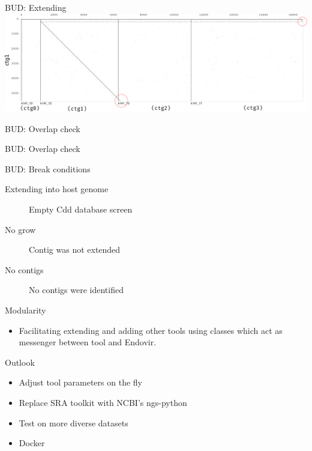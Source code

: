 \documentclass{beamer}
\begin{document}
  \begin{frame}{BUD: Extending}
    \includegraphics[width=\linewidth]{figs/ebovexample/flanks/flankgrow.pdf}
  \end{frame}


  \begin{frame}{BUD: Overlap check}
    
  \end{frame}

  \begin{frame}{BUD: Overlap check}
    
  \end{frame}

  \begin{frame}{BUD: Break conditions}
    \begin{description}
      \item[Extending into host genome]  Empty Cdd database screen
      \item[No grow] Contig was not extended
      \item[No contigs] No contigs were identified
    \end{description}
  \end{frame}

  \begin{frame}{Modularity}
    \begin{itemize}
     \item Facilitating extending and adding other tools using classes
           which act as messenger between tool and Endovir.
    \end{itemize}
    
  \end{frame}



  \begin{frame}{Outlook}
    \begin{itemize}
     \item Adjust tool parameters on the fly
     \item Replace SRA toolkit with NCBI's ngs-python
     \item Test on more diverse datasets
     \item Docker
    \end{itemize}
  \end{frame}
\end{document}
